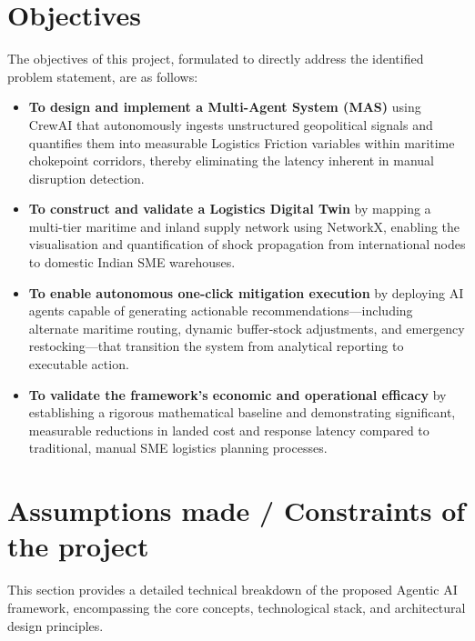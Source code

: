 \section[Objectives]{\textbf{Objectives}}
The objectives of this project, formulated to directly address the identified problem statement, are as follows:
\begin{itemize}
    \item[\textbf{(i)}] \textbf{To design and implement a Multi-Agent System (\gls{MAS})} using CrewAI that autonomously ingests unstructured geopolitical signals and quantifies them into measurable Logistics Friction variables within maritime chokepoint corridors, thereby eliminating the latency inherent in manual disruption detection.
    \item[\textbf{(ii)}] \textbf{To construct and validate a Logistics Digital Twin} by mapping a multi-tier maritime and inland supply network using NetworkX, enabling the visualisation and quantification of shock propagation from international nodes to domestic Indian SME warehouses.
    \item[\textbf{(iii)}] \textbf{To enable autonomous one-click mitigation execution} by deploying AI agents capable of generating actionable recommendations---including alternate maritime routing, dynamic buffer-stock adjustments, and emergency restocking---that transition the system from analytical reporting to executable action.
    \item[\textbf{(iv)}] \textbf{To validate the framework's economic and operational efficacy} by establishing a rigorous mathematical baseline and demonstrating significant, measurable reductions in landed cost and response latency compared to traditional, manual SME logistics planning processes.
\end{itemize}

\section[Assumptions made / Constraints of the project]{\textbf{Assumptions made / Constraints of the project}}

This section provides a detailed technical breakdown of the proposed Agentic AI framework, encompassing the core concepts, technological stack, and architectural design principles.

